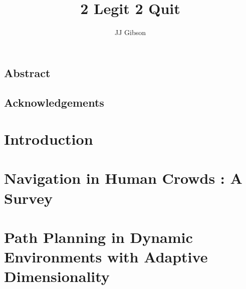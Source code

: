 \documentclass[twoside,10pt]{report}
\newcommand*\NewPage{\newpage\null\thispagestyle{empty}\newpage}
\begin{document}


\title{2 Legit 2 Quit}
\author{JJ Gibson}



\clearpage



\setcounter{page}{1}
\NewPage
\begin{centering} \section*{Abstract} \end{centering}


\NewPage

\begin{centering} \section*{Acknowledgements} \end{centering}


\NewPage


\tableofcontents
\clearpage


\setcounter{page}{1}


\chapter{Introduction}
\label{chap:introduction}


\clearpage

\chapter{Navigation in Human Crowds : A Survey}
\label{chap:survey}


\clearpage

\chapter{Path Planning in Dynamic Environments with Adaptive Dimensionality}
\label{chap:ppad}


\clearpage
\end{document}
